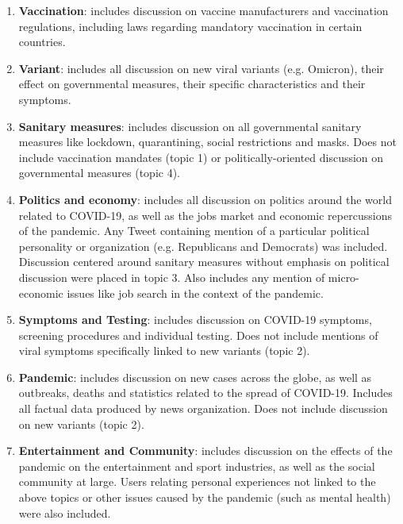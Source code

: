 \documentclass[letterpaper]{article} %
\begin{document}
\begin{enumerate}
    \item \textbf{Vaccination}: includes discussion on vaccine manufacturers and vaccination regulations, including laws regarding mandatory vaccination in certain countries. 
    
    \item \textbf{Variant}: includes all discussion on new viral variants (e.g. Omicron), their effect on governmental measures, their specific characteristics and their symptoms. 
    
    \item \textbf{Sanitary measures}: includes discussion on all governmental sanitary measures like lockdown, quarantining, social restrictions and masks. Does not include vaccination mandates (topic 1) or politically-oriented discussion on governmental measures (topic 4). 
    
    \item \textbf{Politics and economy}: includes all discussion on politics around the world related to COVID-19, as well as the jobs market and economic repercussions of the pandemic. Any Tweet containing mention of a particular political personality or organization (e.g. Republicans and Democrats) was included. Discussion centered around sanitary measures without emphasis on political discussion were placed in topic 3. Also includes any mention of micro-economic issues like job search in the context of the pandemic.  
    
    \item \textbf{Symptoms and Testing}: includes discussion on COVID-19 symptoms, screening procedures and individual testing. Does not include mentions of viral symptoms specifically linked to new variants (topic 2). 
    
    \item \textbf{Pandemic}: includes discussion on new cases across the globe, as well as outbreaks, deaths and statistics related to the spread of COVID-19. Includes all factual data produced by news organization. Does not include discussion on new variants (topic 2).  
    
    \item \textbf{Entertainment and Community}: includes discussion on the effects of the pandemic on the entertainment and sport industries, as well as the social community at large. Users relating personal experiences not linked to the above topics or other issues caused by the pandemic (such as mental health) were also included. 
    
\end{enumerate}
\end{document}

